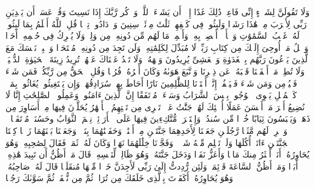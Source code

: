 \stopbuffer%
\startbuffer[\q:18:23]
وَلَا تَقُولَنَّ لِشَا۟یۡءٍ إِنِّی فَاعِلࣱ ذَٰلِكَ غَدًا%
\stopbuffer%
\startbuffer[\q:18:24]
إِلَّاۤ أَن یَشَاۤءَ ٱللَّهُۚ وَٱذۡكُر رَّبَّكَ إِذَا نَسِیتَ وَقُلۡ عَسَىٰۤ أَن یَهۡدِیَنِ رَبِّی لِأَقۡرَبَ مِنۡ هَٰذَا رَشَدࣰا%
\stopbuffer%
\startbuffer[\q:18:25]
وَلَبِثُوا۟ فِی كَهۡفِهِمۡ ثَلَٰثَ مِا۟ئَةࣲ سِنِینَ وَٱزۡدَادُوا۟ تِسۡعࣰا%
\stopbuffer%
\startbuffer[\q:18:26]
قُلِ ٱللَّهُ أَعۡلَمُ بِمَا لَبِثُوا۟ۖ لَهُۥ غَیۡبُ ٱلسَّمَٰوَٰتِ وَٱلۡأَرۡضِۖ أَبۡصِرۡ بِهِۦ وَأَسۡمِعۡۚ مَا لَهُم مِّن دُونِهِۦ مِن وَلِیࣲّ وَلَا یُشۡرِكُ فِی حُكۡمِهِۦۤ أَحَدࣰا%
\stopbuffer%
\startbuffer[\q:18:27]
وَٱتۡلُ مَاۤ أُوحِیَ إِلَیۡكَ مِن كِتَابِ رَبِّكَۖ لَا مُبَدِّلَ لِكَلِمَٰتِهِۦ وَلَن تَجِدَ مِن دُونِهِۦ مُلۡتَحَدࣰا%
\stopbuffer%
\startbuffer[\q:18:28]
وَٱصۡبِرۡ نَفۡسَكَ مَعَ ٱلَّذِینَ یَدۡعُونَ رَبَّهُم بِٱلۡغَدَوٰةِ وَٱلۡعَشِیِّ یُرِیدُونَ وَجۡهَهُۥۖ وَلَا تَعۡدُ عَیۡنَاكَ عَنۡهُمۡ تُرِیدُ زِینَةَ ٱلۡحَیَوٰةِ ٱلدُّنۡیَاۖ وَلَا تُطِعۡ مَنۡ أَغۡفَلۡنَا قَلۡبَهُۥ عَن ذِكۡرِنَا وَٱتَّبَعَ هَوَىٰهُ وَكَانَ أَمۡرُهُۥ فُرُطࣰا%
\stopbuffer%
\startbuffer[\q:18:29]
وَقُلِ ٱلۡحَقُّ مِن رَّبِّكُمۡۖ فَمَن شَاۤءَ فَلۡیُؤۡمِن وَمَن شَاۤءَ فَلۡیَكۡفُرۡۚ إِنَّاۤ أَعۡتَدۡنَا لِلظَّٰلِمِینَ نَارًا أَحَاطَ بِهِمۡ سُرَادِقُهَاۚ وَإِن یَسۡتَغِیثُوا۟ یُغَاثُوا۟ بِمَاۤءࣲ كَٱلۡمُهۡلِ یَشۡوِی ٱلۡوُجُوهَۚ بِئۡسَ ٱلشَّرَابُ وَسَاۤءَتۡ مُرۡتَفَقًا%
\stopbuffer%
\startbuffer[\q:18:30]
إِنَّ ٱلَّذِینَ ءَامَنُوا۟ وَعَمِلُوا۟ ٱلصَّٰلِحَٰتِ إِنَّا لَا نُضِیعُ أَجۡرَ مَنۡ أَحۡسَنَ عَمَلًا%
\stopbuffer%
\startbuffer[\q:18:31]
أُو۟لَٰۤئِكَ لَهُمۡ جَنَّٰتُ عَدۡنࣲ تَجۡرِی مِن تَحۡتِهِمُ ٱلۡأَنۡهَٰرُ یُحَلَّوۡنَ فِیهَا مِنۡ أَسَاوِرَ مِن ذَهَبࣲ وَیَلۡبَسُونَ ثِیَابًا خُضۡرࣰا مِّن سُندُسࣲ وَإِسۡتَبۡرَقࣲ مُّتَّكِءِینَ فِیهَا عَلَى ٱلۡأَرَاۤئِكِۚ نِعۡمَ ٱلثَّوَابُ وحَسُنَتۡ مُرۡتَفَقࣰا%
\stopbuffer%
\startbuffer[\q:18:32]
۞ وَٱضۡرِبۡ لَهُم مَّثَلࣰا رَّجُلَیۡنِ جَعَلۡنَا لِأَحَدِهِمَا جَنَّتَیۡنِ مِنۡ أَعۡنَٰبࣲ وَحَفَفۡنَٰهُمَا بِنَخۡلࣲ وَجَعَلۡنَا بَیۡنَهُمَا زَرۡعࣰا%
\stopbuffer%
\startbuffer[\q:18:33]
كِلۡتَا ٱلۡجَنَّتَیۡنِ ءَاتَتۡ أُكُلَهَا وَلَمۡ تَظۡلِم مِّنۡهُ شَیۡءࣰاۚ وَفَجَّرۡنَا خِلَٰلَهُمَا نَهَرࣰا%
\stopbuffer%
\startbuffer[\q:18:34]
وَكَانَ لَهُۥ ثَمَرࣱ فَقَالَ لِصَٰحِبِهِۦ وَهُوَ یُحَاوِرُهُۥۤ أَنَا۠ أَكۡثَرُ مِنكَ مَالࣰا وَأَعَزُّ نَفَرࣰا%
\stopbuffer%
\startbuffer[\q:18:35]
وَدَخَلَ جَنَّتَهُۥ وَهُوَ ظَالِمࣱ لِّنَفۡسِهِۦ قَالَ مَاۤ أَظُنُّ أَن تَبِیدَ هَٰذِهِۦۤ أَبَدࣰا%
\stopbuffer%
\startbuffer[\q:18:36]
وَمَاۤ أَظُنُّ ٱلسَّاعَةَ قَاۤئِمَةࣰ وَلَئِن رُّدِدتُّ إِلَىٰ رَبِّی لَأَجِدَنَّ خَیۡرࣰا مِّنۡهَا مُنقَلَبࣰا%
\stopbuffer%
\startbuffer[\q:18:37]
قَالَ لَهُۥ صَاحِبُهُۥ وَهُوَ یُحَاوِرُهُۥۤ أَكَفَرۡتَ بِٱلَّذِی خَلَقَكَ مِن تُرَابࣲ ثُمَّ مِن نُّطۡفَةࣲ ثُمَّ سَوَّىٰكَ رَجُلࣰا%
